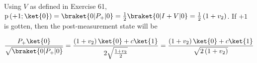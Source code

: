 \par Using $V$ as defined in Exercise 61, $\mathrm{p} \left(+1 ; \ket{0} \right)
= \braket{0|P_+|0} = \frac{1}{2} \braket{0 | I + V | 0} = \frac{1}{2} \left( 1 +
v_2 \right)$. If $+1$ is gotten, then the post-measurement state will be

$$
\frac{P_+ \ket{0}}{\sqrt{\braket{0|P_+|0}}} = \frac{\left( 1 + v_2 \right)
\ket{0} + c \ket{1}}{2 \sqrt{\frac{1 + v_2}{2}}} = \frac{\left( 1 + v_2 \right)
\ket{0} + c \ket{1}}{\sqrt{2 \left( 1 + v_2 \right)}}
$$
